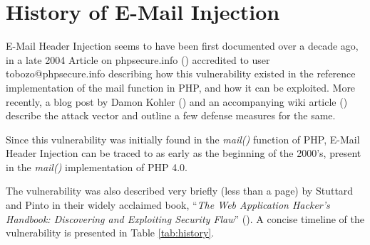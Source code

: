 \section{History of E-Mail Injection}

E-Mail Header Injection seems to have been first documented over a decade ago, in a late 2004 Article on phpsecure.info (\cite{Tobozo}) accredited to user tobozo@phpsecure.info describing how this vulnerability existed in the reference implementation of the mail function in PHP, and how it can be exploited. More recently, a blog post by Damon Kohler (\cite{DK}) and an accompanying wiki article (\cite{Injection}) describe the attack vector and outline a few defense measures for the same.

Since this vulnerability was initially found in the \emph{mail()} function of PHP, E-Mail Header Injection can be traced to as early as the beginning of the 2000's, present in the \emph{mail()} implementation of PHP 4.0. 

The vulnerability was also described very briefly (less than a page) by Stuttard and Pinto in their widely acclaimed book, ``\emph{The Web Application Hacker's Handbook: Discovering and Exploiting Security Flaw}'' (\cite{stuttard2011web}). 
A concise timeline of the vulnerability is presented in Table \ref{tab:history}.


